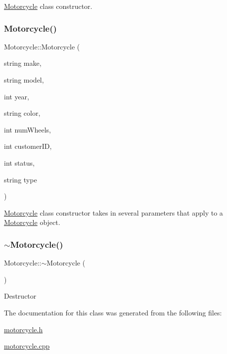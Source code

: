 \hyperlink{class_motorcycle}{Motorcycle} class constructor. \mbox{\label{class_motorcycle_ae3f0c6f4817595fea8e0486d51d12f73}} 
\subsubsection{\texorpdfstring{Motorcycle()}{Motorcycle()}\hspace{0.1cm}{\footnotesize\ttfamily [2/2]}}
{\footnotesize\ttfamily Motorcycle\+::\+Motorcycle (\begin{DoxyParamCaption}\item[{string}]{make,  }\item[{string}]{model,  }\item[{int}]{year,  }\item[{string}]{color,  }\item[{int}]{num\+Wheels,  }\item[{int}]{customer\+ID,  }\item[{int}]{status,  }\item[{string}]{type }\end{DoxyParamCaption})}

\hyperlink{class_motorcycle}{Motorcycle} class constructor takes in several parameters that apply to a \hyperlink{class_motorcycle}{Motorcycle} object. \mbox{\label{class_motorcycle_ae202420292e8ce9745243b70bf873664}} 
\subsubsection{\texorpdfstring{$\sim$\+Motorcycle()}{~Motorcycle()}}
{\footnotesize\ttfamily Motorcycle\+::$\sim$\+Motorcycle (\begin{DoxyParamCaption}{ }\end{DoxyParamCaption})}

Destructor 

The documentation for this class was generated from the following files\+:\begin{DoxyCompactItemize}
\item 
\hyperlink{motorcycle_8h}{motorcycle.\+h}\item 
\hyperlink{motorcycle_8cpp}{motorcycle.\+cpp}\end{DoxyCompactItemize}
